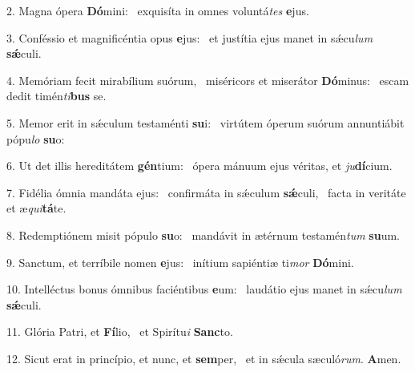 2. Magna ópera \textbf{Dó}mini: \ast\  exquisíta in omnes voluntá\textit{tes} \textbf{e}jus.\

3. Conféssio et magnificéntia opus \textbf{e}jus: \ast\  et justítia ejus manet in sǽcu\textit{lum} \textbf{sǽ}culi.\

4. Memóriam fecit mirabílium suórum, \dag\  miséricors et miserátor \textbf{Dó}minus: \ast\  escam dedit timén\textit{ti}\textbf{bus} se.\

5. Memor erit in sǽculum testaménti \textbf{su}i: \ast\  virtútem óperum suórum annuntiábit pópu\textit{lo} \textbf{su}o:\

6. Ut det illis hereditátem \textbf{gén}tium: \ast\  ópera mánuum ejus véritas, et \textit{ju}\textbf{dí}cium.\

7. Fidélia ómnia mandáta ejus: \dag\  confirmáta in sǽculum \textbf{sǽ}culi, \ast\  facta in veritáte et æ\textit{qui}\textbf{tá}te.\

8. Redemptiónem misit pópulo \textbf{su}o: \ast\  mandávit in ætérnum testamén\textit{tum} \textbf{su}um.\

9. Sanctum, et terríbile nomen \textbf{e}jus: \ast\  inítium sapiéntiæ ti\textit{mor} \textbf{Dó}mini.\

10. Intelléctus bonus ómnibus faciéntibus \textbf{e}um: \ast\  laudátio ejus manet in sǽcu\textit{lum} \textbf{sǽ}culi.\

11. Glória Patri, et \textbf{Fí}lio, \ast\  et Spirítu\textit{i} \textbf{Sanc}to.\

12. Sicut erat in princípio, et nunc, et \textbf{sem}per, \ast\  et in sǽcula sæculó\textit{rum}. \textbf{A}men.\

